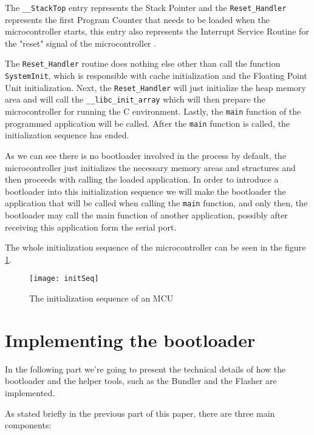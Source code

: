 \documentclass[10pt,a4paper,twoside]{article}
\begin{document}
The \texttt{\_\_StackTop} entry represents the Stack Pointer and the \texttt{Reset\_Handler} represents the first Program Counter that needs to be loaded when the microcontroller starts, this entry also represents the Interrupt Service Routine for the "reset" signal of the microcontroller \cite{kv5x}.

The \texttt{Reset\_Handler} routine does nothing else other than call the function \texttt{SystemInit}, which is responsible with cache initialization and the Floating Point Unit initialization. Next, the \texttt{Reset\_Handler} will just initialize the heap memory area and will call the \texttt{\_\_libc\_init\_array} which will then prepare the microcontroller for running the C environment. Lastly, the \texttt{main} function of the programmed application will be called. After the \texttt{main} function is called, the initialization sequence has ended.

As we can see there is no bootloader involved in the process by default, the microcontroller just initializes the necessary memory areas and structures and then proceeds with calling the loaded application.
In order to introduce a bootloader into this initialization sequence we will make the bootloader the application that will be called when calling the \texttt{main} function, and only then, the bootloader may call the main function of another application, possibly after receiving this application form the serial port.

The whole initialization sequence of the microcontroller can be seen in the figure \ref{initSeq}.

\begin{figure}[h]
    \centering
    \texttt{[image: initSeq]}
    \caption{The initialization sequence of an MCU}
    \label{initSeq}
\end{figure}

\section{Implementing the bootloader}
In the following part we're going to present the technical details of how the bootloader and the helper tools, such as the Bundler and the Flasher are implemented.

As stated briefly in the previous part of this paper, there are three main components:
\end{document}
